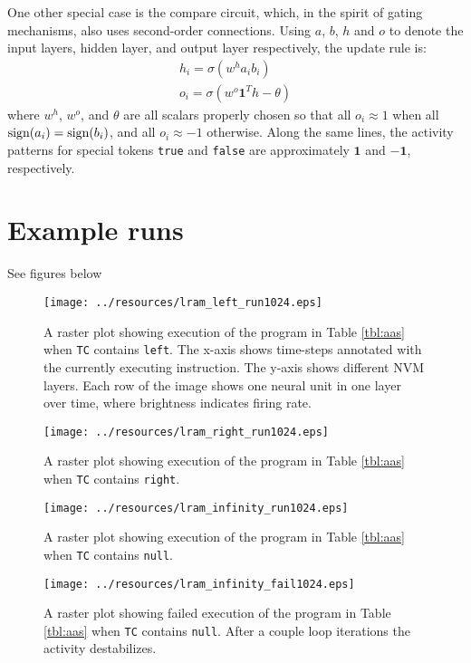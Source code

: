 \documentclass[pdftex,12pt,letterpaper]{article}
\newcommand{\sign}{\text{\upshape{sign}}}
\begin{document}
One other special case is the compare circuit, which, in the spirit of gating mechanisms, also uses second-order connections.  Using $a$, $b$, $h$ and $o$ to denote the input layers, hidden layer, and output layer respectively, the update rule is:
\begin{align}
h_i = \sigma\left(w^ha_ib_i\right) \\
o_i = \sigma\left(w^o\textbf{1}^Th - \theta\right)
\end{align}
where $w^h$, $w^o$, and $\theta$ are all scalars properly chosen so that all $o_i \approx 1$ when all $\sign(a_i) = \sign(b_i)$, and all $o_i \approx -1$ otherwise.  Along the same lines, the activity patterns for special tokens \texttt{true} and \texttt{false} are approximately $\mathbf{1}$ and $-\mathbf{1}$, respectively.

\section{Example runs}

See figures below

\begin{sidewaysfigure}
\centering
\texttt{[image: ../resources/lram\_left\_run1024.eps]}
\caption{A raster plot showing execution of the program in Table \ref{tbl:aas} when \texttt{TC} contains \texttt{left}.  The x-axis shows time-steps annotated with the currently executing instruction.  The y-axis shows different NVM layers.  Each row of the image shows one neural unit in one layer over time, where brightness indicates firing rate.}
\end{sidewaysfigure}

\begin{sidewaysfigure}
\centering
\texttt{[image: ../resources/lram\_right\_run1024.eps]}
\caption{A raster plot showing execution of the program in Table \ref{tbl:aas} when \texttt{TC} contains \texttt{right}.}
\end{sidewaysfigure}

\begin{sidewaysfigure}
\centering
\texttt{[image: ../resources/lram\_infinity\_run1024.eps]}
\caption{A raster plot showing execution of the program in Table \ref{tbl:aas} when \texttt{TC} contains \texttt{null}.}
\end{sidewaysfigure}

\begin{sidewaysfigure}
\centering
\texttt{[image: ../resources/lram\_infinity\_fail1024.eps]}
\caption{A raster plot showing failed execution of the program in Table \ref{tbl:aas} when \texttt{TC} contains \texttt{null}.  After a couple loop iterations the activity destabilizes.}
\label{fig:fail}
\end{sidewaysfigure}
\end{document}
